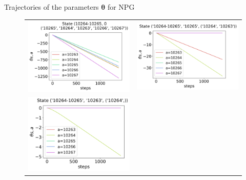 \documentclass[10pt, aspectratio=169, compress, protectframetitle, handout]{beamer}
\begin{document}
\begin{frame}{Trajectories of the parameters $\boldsymbol \theta$ for NPG}

    \begin{figure}
        \centering
        \begin{tabular}{cc}
            \includegraphics[scale=0.34,valign=b]{figures/theta_NPG_state_0.png} &
            \includegraphics[scale=0.34,valign=b]{figures/theta_NPG_state_1.png} \\
            \hspace*{9pt}\includegraphics[scale=0.34,valign=b]{figures/theta_NPG_state_2.png} &

\end{tabular}
\end{figure}
\end{frame}
\end{document}
